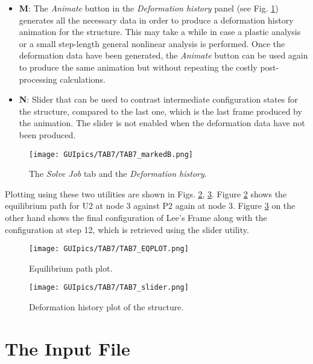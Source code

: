 \begin{itemize}
	\item \textbf{M}: The \textit{Animate} button in the \textit{Deformation 
	history} panel (see Fig. \ref{fig:TAB7_markedB}) generates all the 
	necessary data in order to produce a deformation history animation for the 
	structure. This may take a while in case a plastic analysis or a small 
	step-length general nonlinear analysis is performed. Once the deformation 
	data have been generated, the \textit{Animate} button can be used again to 
	produce the same animation but without repeating the costly post-processing 
	calculations.
	
	\item \textbf{N}: Slider that can be used to contrast intermediate 
	configuration states for the structure, compared to the last one, which is 
	the last frame produced by the animation. The slider is not enabled when 
	the deformation data have not been produced. 
\end{itemize}

\begin{figure}
	\centering
	\texttt{[image: GUIpics/TAB7/TAB7\_markedB.png]}
	\caption{The \textit{Solve Job} tab and the \textit{Deformation history}.}
	\label{fig:TAB7_markedB}
\end{figure}

Plotting using these two utilities are shown in Figs. \ref{fig:TAB7_EQPLOT}, 
\ref{fig:TAB7_slider}. Figure \ref{fig:TAB7_EQPLOT} shows the equilibrium path 
for U2 at node 3 against P2 again at node 3. Figure \ref{fig:TAB7_slider} on 
the other hand shows the final configuration of Lee's Frame along with the 
configuration at step 12, which is retrieved using the slider utility.

\begin{figure}
	\centering
	\texttt{[image: GUIpics/TAB7/TAB7\_EQPLOT.png]}
	\caption{Equilibrium path plot.}
	\label{fig:TAB7_EQPLOT}
\end{figure}

\begin{figure}
	\centering
	\texttt{[image: GUIpics/TAB7/TAB7\_slider.png]}
	\caption{Deformation history plot of the structure.}
	\label{fig:TAB7_slider}
\end{figure}

\section{The Input File}\label{INPUTFILE}

